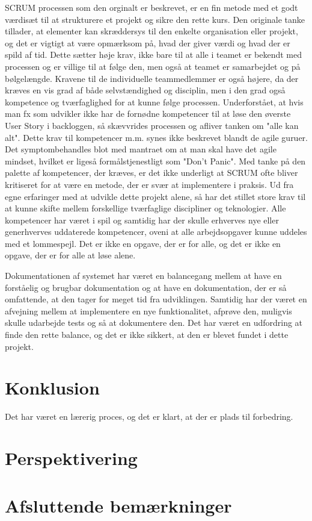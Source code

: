 SCRUM processen som den orginalt er beskrevet, er en fin metode med et godt værdisæt til at strukturere et projekt og sikre den rette kurs.
Den originale tanke tillader, at elementer kan skræddersys til den enkelte organisation eller projekt, og det er vigtigt at være opmærksom på, hvad der giver værdi og hvad der er spild af tid.
Dette sætter høje krav, ikke bare til at alle i teamet er bekendt med processen og er villige til at følge den, men også at teamet er samarbejdet og på bølgelængde.
Kravene til de individuelle teammedlemmer er også højere, da der kræves en vis grad af både selvstændighed og disciplin, men i den grad også kompetence og tværfaglighed for at kunne følge processen.
Underforstået, at hvis man fx som udvikler ikke har de fornødne kompetencer til at løse den øverste User Story i backloggen, så skævvrides processen og afliver tanken om "alle kan alt". 
Dette krav til kompetencer m.m. synes ikke beskrevet blandt de agile guruer. Det symptombehandles blot med mantraet om at man skal have det agile mindset, hvilket er ligeså formålstjenestligt som "Don't Panic".
Med tanke på den palette af kompetencer, der kræves, er det ikke underligt at SCRUM ofte bliver kritiseret for at være en metode, der er svær at implementere i praksis.
Ud fra egne erfaringer med at udvikle dette projekt alene, så har det stillet store krav til at kunne skifte mellem forskellige tværfaglige discipliner og teknologier. 
Alle kompetencer har været i spil og samtidig har der skulle erhverves nye eller generhverves uddaterede kompetencer, oveni at alle arbejdsopgaver kunne uddeles med et lommespejl.
Det er ikke en opgave, der er for alle, og det er ikke en opgave, der er for alle at løse alene.

Dokumentationen af systemet har været en balancegang mellem at have en forståelig og brugbar dokumentation og at have en dokumentation, der er så omfattende, at den tager for meget tid fra udviklingen.
Samtidig har der været en afvejning mellem at implementere en nye funktionalitet, afprøve den, muligvis skulle udarbejde tests og så at dokumentere den.
Det har været en udfordring at finde den rette balance, og det er ikke sikkert, at den er blevet fundet i dette projekt.  

\section{Konklusion}
\label{sec:conclusion_conclusion}
Det har været en lærerig proces, og det er klart, at der er plads til forbedring.

\section{Perspektivering}
\label{sec:conclusion_perspective}

\section{Afsluttende bemærkninger}
\label{sec:conclusion_remarks}

